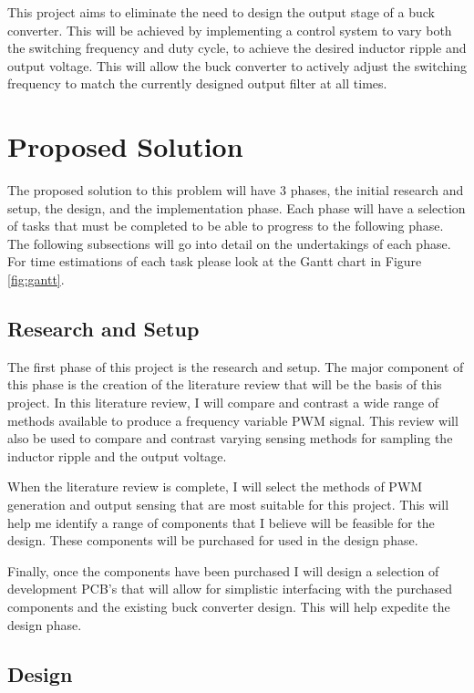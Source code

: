 \documentclass[11pt, a4paper, twoside, openright]{report}
\begin{document}
This project aims to eliminate the need to design the output stage of a buck converter. This will be achieved by implementing a control system to vary both the switching frequency and duty cycle, to achieve the desired inductor ripple and output voltage. This will allow the buck converter to actively adjust the switching frequency to match the currently designed output filter at all times.

\section{Proposed Solution}

The proposed solution to this problem will have 3 phases, the initial research and setup, the design, and the implementation phase. Each phase will have a selection of tasks that must be completed to be able to progress to the following phase. The following subsections will go into detail on the undertakings of each phase. For time estimations of each task please look at the Gantt chart in Figure \ref{fig:gantt}.

\subsection{Research and Setup}

The first phase of this project is the research and setup. The major component of this phase is the creation of the literature review that will be the basis of this project. In this literature review, I will compare and contrast a wide range of methods available to produce a frequency variable PWM signal. This review will also be used to compare and contrast varying sensing methods for sampling the inductor ripple and the output voltage. 

When the literature review is complete, I will select the methods of PWM generation and output sensing that are most suitable for this project. This will help me identify a range of components that I believe will be feasible for the design. These components will be purchased for used in the design phase. 

Finally, once the components have been purchased I will design a selection of development PCB's that will allow for simplistic interfacing with the purchased components and the existing buck converter design. This will help expedite the design phase.

\subsection{Design}
\label{sec:design}
\end{document}
